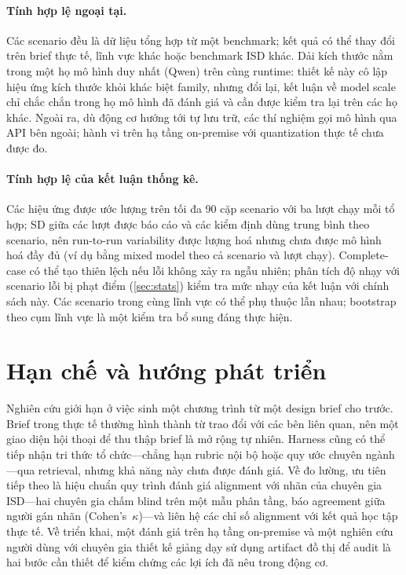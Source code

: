 \paragraph{Tính hợp lệ ngoại tại.}
Các scenario đều là dữ liệu tổng hợp từ một benchmark; kết quả có thể thay đổi trên
brief thực tế, lĩnh vực khác hoặc benchmark ISD khác. Dải kích thước nằm trong một họ
mô hình duy nhất (Qwen) trên cùng runtime: thiết kế này cô lập hiệu ứng kích thước
khỏi khác biệt family, nhưng đổi lại, kết luận về model scale chỉ chắc chắn trong họ
mô hình đã đánh giá và cần được kiểm tra lại trên các họ khác. Ngoài ra, dù động cơ
hướng tới tự lưu trữ, các thí nghiệm gọi mô hình qua API bên ngoài; hành vi trên
hạ tầng on-premise với quantization thực tế chưa được đo.

\paragraph{Tính hợp lệ của kết luận thống kê.}
Các hiệu ứng được ước lượng trên tối đa 90 cặp scenario với ba lượt chạy mỗi tổ hợp;
SD giữa các lượt được báo cáo và các kiểm định dùng trung bình theo scenario, nên
run-to-run variability được lượng hoá nhưng chưa được mô hình hoá đầy đủ (ví dụ bằng
mixed model theo cả scenario và lượt chạy). Complete-case có thể tạo thiên lệch nếu
lỗi không xảy ra ngẫu nhiên; phân tích độ nhạy với scenario lỗi bị phạt điểm
(\cref{sec:stats}) kiểm tra mức nhạy của kết luận với chính sách này. Các scenario
trong cùng lĩnh vực có thể phụ thuộc lẫn nhau; bootstrap theo cụm lĩnh vực là một
kiểm tra bổ sung đáng thực hiện.

\section{Hạn chế và hướng phát triển}
\label{sec:future-work}

Nghiên cứu giới hạn ở việc sinh một chương trình từ một design brief cho trước. Brief
trong thực tế thường hình thành từ trao đổi với các bên liên quan, nên một giao diện hội
thoại để thu thập brief là mở rộng tự nhiên. Harness cũng có thể tiếp nhận tri thức tổ
chức---chẳng hạn rubric nội bộ hoặc quy ước chuyên ngành---qua retrieval, nhưng khả năng
này chưa được đánh giá. Về đo lường, ưu tiên tiếp theo là hiệu chuẩn quy trình đánh
giá alignment với nhãn của chuyên gia ISD---hai chuyên gia chấm blind trên một mẫu
phân tầng, báo agreement giữa người gán nhãn (Cohen's~$\kappa$)---và liên hệ các chỉ
số alignment với kết quả học tập thực tế. Về triển khai, một đánh giá trên hạ tầng
on-premise và một nghiên cứu người dùng với chuyên gia thiết kế giảng dạy sử dụng
artifact đồ thị để audit là hai bước cần thiết để kiểm chứng các lợi ích đã nêu trong
động cơ.
